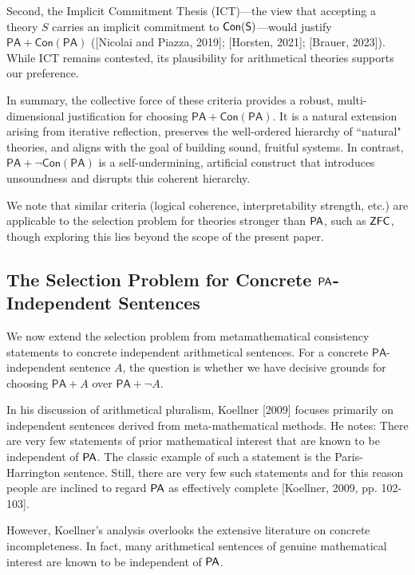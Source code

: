 \documentclass[a4paper,12pt]{amsart}
\theoremstyle{definition}
\numberwithin{equation}{section}
\begin{document}
Second, the Implicit Commitment Thesis ({\sf ICT})—the view that accepting a theory $S$ carries an implicit commitment to $\sf Con(S)$—would justify $\mathsf{PA} + \mathsf{Con(PA)}$ ([Nicolai and Piazza, 2019]; [Horsten, 2021]; [Brauer, 2023]). While {\sf ICT} remains contested, its plausibility for arithmetical theories supports our preference.
 
In summary, the collective force of these criteria provides a robust, multi-dimensional justification for choosing $\mathsf{PA} + \mathsf{Con(PA)}$. It is a natural extension arising from iterative reflection, preserves the well-ordered hierarchy of ``natural" theories, and aligns with the goal of building sound, fruitful systems. In contrast, $\mathsf{PA} + \neg \mathsf{Con(PA)}$ is a self-undermining, artificial construct that introduces unsoundness and disrupts this coherent hierarchy.


We note that similar criteria (logical coherence, interpretability strength, etc.) are applicable to the selection problem for theories stronger than $\sf PA$, such as $\sf ZFC$, though exploring this lies beyond the scope of the present paper.


\subsection{The Selection Problem for Concrete $\sf PA$-Independent Sentences}\label{selection for concrete}

We now extend the selection problem from metamathematical consistency statements to concrete independent arithmetical sentences. For a concrete \(\mathsf{PA}\)-independent sentence \(A\), the question is whether we have decisive grounds for choosing \(\mathsf{PA}+A\) over \(\mathsf{PA}+\neg A\).
 
In his discussion of arithmetical pluralism, Koellner [2009] focuses primarily on independent sentences derived from meta-mathematical methods. He notes: There are very few statements of prior mathematical interest that are known to be independent of ${\sf PA}$. The classic example of such a statement is the Paris-Harrington sentence. Still, there are very few such statements and for this reason people are inclined to regard ${\sf PA}$ as effectively complete [Koellner, 2009, pp. 102-103].

However, Koellner's analysis overlooks the extensive literature on concrete incompleteness. In fact, many arithmetical sentences of genuine mathematical interest are known to be independent of ${\sf PA}$.
\end{document}
